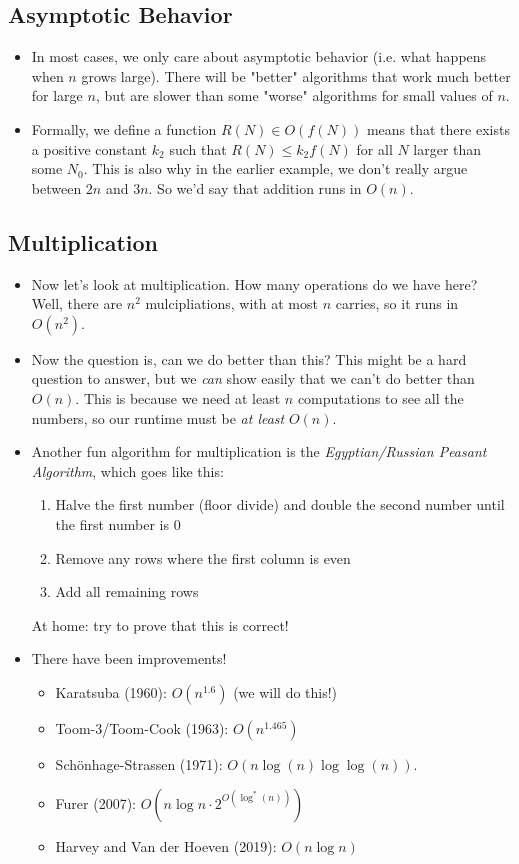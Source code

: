 \subsection{Asymptotic Behavior}
\begin{itemize}
	\item In most cases, we only care about asymptotic behavior (i.e. what happens when \( n \) grows large). There will be 
		"better" algorithms that work much better for large \( n \), but are slower than some "worse" algorithms for small 
		values of \( n \). 
	\item Formally, we define a function \( R(N) \in O(f(N)) \) means that there exists a positive constant \( k_2 \) such that 
		\( R(N) \le k_2f(N) \) for all \( N \) larger than some \( N_0 \). This is also why in the earlier example, 
		we don't really argue between \( 2n \) and \( 3n \). So we'd say that addition runs in \( O(n) \). 
\end{itemize}
\subsection{Multiplication} 
\begin{itemize}
	\item Now let's look at multiplication. How many operations do we have here? Well, there are \( n^2 \) mulcipliations, with 
		at most \( n \) carries, so it runs in \( O(n^2) \). 
	\item Now the question is, can we do better than this? This might be a hard question to answer, but we \textit{can} show 
		easily that we can't do better than \( O(n) \). This is because we need at least \( n \) computations to see all the 
		numbers, so our runtime must be \textit{at least} \( O(n) \). 
	\item Another fun algorithm for multiplication is the \textit{Egyptian/Russian Peasant Algorithm}, which goes like this:
		\begin{enumerate}[label=\arabic*)]
			\item Halve the first number (floor divide) and double the second number until the first number is 0
			\item Remove any rows where the first column is even
			\item Add all remaining rows
		\end{enumerate}

		At home: try to prove that this is correct!
	\item There have been improvements!
		\begin{itemize}
			\item Karatsuba (1960): \( O(n^{1.6}) \) (we will do this!)
			\item Toom-3/Toom-Cook (1963): \( O(n^{1.465}) \) 
			\item Sch\"onhage-Strassen (1971): \( O(n \log(n) \log\log(n)) \). 
			\item Furer (2007): \( O(n \log n \cdot 2^{O(\log^*(n))}) \) 
			\item Harvey and Van der Hoeven (2019): \( O(n \log n) \)
		\end{itemize}
\end{itemize}

